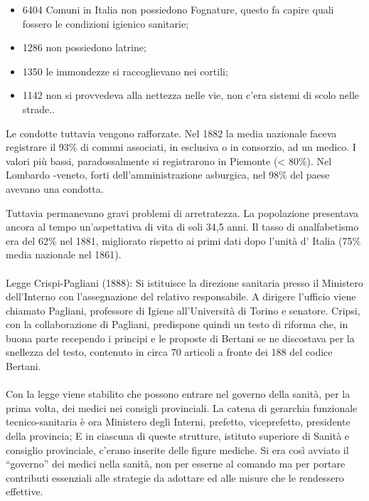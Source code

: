 \begin{itemize}
\item
6404 Comuni in Italia non possiedono Fognature, questo fa capire quali
fossero le condizioni igienico sanitarie;
\item 1286 non possiedono latrine;
\item 1350 le immondezze si raccoglievano nei cortili;
\item 1142 non si provvedeva alla nettezza nelle vie, non c'era sistemi di
scolo nelle strade..
\end{itemize}

Le condotte tuttavia vengono rafforzate. Nel 1882 la media nazionale
faceva registrare il 93\% di comuni associati, in esclusiva o in
consorzio, ad un medico. I valori più bassi, paradossalmente si
registrarono in Piemonte (\textless{} 80\%). Nel Lombardo -veneto, forti
dell'amministrazione asburgica, nel 98\% del paese avevano una condotta.

Tuttavia permanevano gravi problemi di arretratezza. La popolazione
presentava ancora al tempo un'aspettativa di vita di soli 34,5 anni. Il
tasso di analfabetismo era del 62\% nel 1881, migliorato rispetto ai
primi dati dopo l'unità d' Italia (75\% media nazionale nel 1861).
\\\\
Legge Crispi-Pagliani (1888): Si istituisce la direzione sanitaria
presso il Ministero dell'Interno con l'assegnazione del relativo
responsabile. A dirigere l'ufficio viene chiamato Pagliani, professore
di Igiene all'Università di Torino e senatore. Cripsi, con la
collaborazione di Pagliani, predispone quindi un testo di riforma che,
in buona parte recependo i principi e le proposte di Bertani se ne
discostava per la snellezza del testo, contenuto in circa 70 articoli a
fronte dei 188 del codice Bertani.
\\\\
Con la legge viene stabilito che possono entrare nel governo della
sanità, per la prima volta, dei medici nei consigli provinciali. La
catena di gerarchia funzionale tecnico-sanitaria è ora Ministero degli
Interni, prefetto, viceprefetto, presidente della provincia; E in
ciascuna di queste strutture, istituto superiore di Sanità e consiglio
provinciale, c'erano inserite delle figure mediche. Si era così avviato
il ``governo'' dei medici nella sanità, non per esserne al comando ma
per portare contributi essenziali alle strategie da adottare ed alle
misure che le rendessero effettive.


